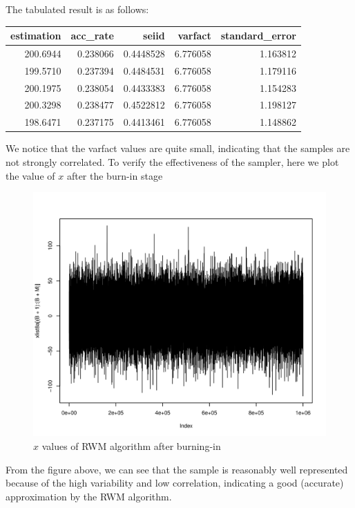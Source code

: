 The tabulated result is as follows:\\
\begin{center}
\begin{knitrout}
\color{fgcolor}
\begin{tabular}{r|r|r|r|r}
\hline
estimation & acc\_rate & seiid & varfact & standard\_error\\
\hline
200.6944 & 0.238066 & 0.4448528 & 6.776058 & 1.163812\\
\hline
199.5710 & 0.237394 & 0.4484531 & 6.776058 & 1.179116\\
\hline
200.1975 & 0.238054 & 0.4433383 & 6.776058 & 1.154283\\
\hline
200.3298 & 0.238477 & 0.4522812 & 6.776058 & 1.198127\\
\hline
198.6471 & 0.237175 & 0.4413461 & 6.776058 & 1.148862\\
\hline
\end{tabular}


\end{knitrout}
\end{center}
We notice that the varfact values are quite small, indicating that the samples are not strongly correlated. To verify the effectiveness of the sampler, here we plot the value of $x$ after the burn-in stage
\begin{figure}[H]
  \centering
\begin{knitrout}
\color{fgcolor}\begin{kframe}
\begin{alltt}
 \hlkwb{=} 
\hlstd{(xlist8a[(B}\hlopt{+}\hlstd{)}\hlopt{:}\hlopt{+}\hlstd{M)],}\hlstd{=}\hlstd{)}
\end{alltt}
\end{kframe}
\includegraphics[width=\maxwidth]{figure/p8aplot-1} 

\end{knitrout}
		\caption{$x$ values of RWM algorithm after burning-in}
\end{figure}
From the figure above, we can see that the sample is reasonably well represented because of the high variability and low correlation, indicating a good (accurate) approximation by the RWM algorithm.\\
